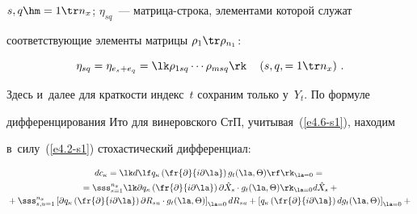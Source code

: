 $s,q\hm=1\tr n_x$; $\eta_{sq}$~--- мат\-ри\-ца-стро\-ка, элементами которой служат

соответствующие элементы матрицы  $\rho_1\tr \rho_{n_1}$:

    \begin{equation*}

    \eta_{sq} =\eta_{e_s+e_q} = \lk \rho_{1sq}\cdots \rho_{msq}\rk

    \quad \left(s,q,=1\tr n_x\right)\,. %

    \end{equation*}

Здесь и~далее для краткости индекс~$t$ сохраним только у~$Y_t$. По формуле 

дифференцирования Ито для винеровского СтП, учитывая~(\ref{e4.6-s1}), находим 

в~силу~(\ref{e4.2-s1}) стохастический дифференциал:

\begin{multline*}

dc_\kappa =\lk d\lf q_\kappa \left(\fr{\partial }{i\partial \la}\right) g_t

    (\la,\Theta)\rf\rk_{\la=0}={}\\

    {}=

    \sss_{s=1}^{n_x} \lk \partial q_\kappa

    \left(\fr{\partial}{i\partial \la}\right) \partial \hat X_s\cdot g_t

    (\la,\Theta)\rk_{\la=0}d \hat X_s+{}\\

    {}+\sss_{s,u=1}^{n_x} \left[\partial

    q_\kappa \left(\fr{\partial }{i\partial \la}\right) \partial R_{su}\cdot g_t

    (\la,\Theta)\right]_{\la=0}dR_{su} + \left[ q_\kappa \left(\fr{\partial}{i\partial

    \la}\right) d g_t (\la,\Theta)\right]_{\la=0}+{}

    \end{multline*}

    

    \noindent

